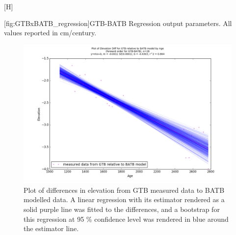 \begin{center}[H]
	\begin{flushleft}
	[fig:GTBxBATB_regression]{GTB-BATB Regression output parameters. All values reported in cm/century.}
	
	\end{flushleft}
\end{center}

\newpage

\begin{figure}[H]
	\includegraphics[width=1.3\linewidth, angle=270 ]{data/bothNonZero/withinSeventyFivePercent/gias/theGIA_GTB_relative_to_BATB.png}
	\caption{Plot of differences in elevation from GTB measured data to BATB modelled data. A linear regression with its estimator rendered as
	 a solid purple line was fitted to the differences, and a bootstrap for this regression at 95 \% confidence level was rendered in blue
	 around the estimator line.}
	\label{fig:gias_GTBxBATB}
\end{figure}
\newpage


